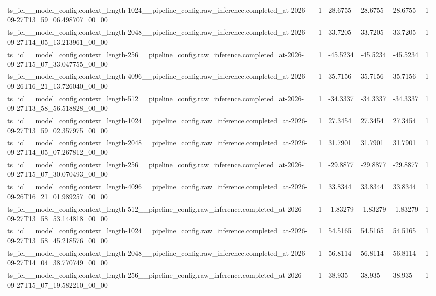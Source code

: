 \begin{tabular}{llllll}
ts\_icl\_\_model\_config.context\_length-1024\_\_pipeline\_config.raw\_inference.completed\_at-2026-09-27T13\_59\_06.498707\_00\_00 & 1 & 28.6755 & 28.6755 & 28.6755 & 1 \\
ts\_icl\_\_model\_config.context\_length-2048\_\_pipeline\_config.raw\_inference.completed\_at-2026-09-27T14\_05\_13.213961\_00\_00 & 1 & 33.7205 & 33.7205 & 33.7205 & 1 \\
ts\_icl\_\_model\_config.context\_length-256\_\_pipeline\_config.raw\_inference.completed\_at-2026-09-27T15\_07\_33.047755\_00\_00 & 1 & -45.5234 & -45.5234 & -45.5234 & 1 \\
ts\_icl\_\_model\_config.context\_length-4096\_\_pipeline\_config.raw\_inference.completed\_at-2026-09-26T16\_21\_13.726040\_00\_00 & 1 & 35.7156 & 35.7156 & 35.7156 & 1 \\
ts\_icl\_\_model\_config.context\_length-512\_\_pipeline\_config.raw\_inference.completed\_at-2026-09-27T13\_58\_56.518828\_00\_00 & 1 & -34.3337 & -34.3337 & -34.3337 & 1 \\
ts\_icl\_\_model\_config.context\_length-1024\_\_pipeline\_config.raw\_inference.completed\_at-2026-09-27T13\_59\_02.357975\_00\_00 & 1 & 27.3454 & 27.3454 & 27.3454 & 1 \\
ts\_icl\_\_model\_config.context\_length-2048\_\_pipeline\_config.raw\_inference.completed\_at-2026-09-27T14\_05\_07.267812\_00\_00 & 1 & 31.7901 & 31.7901 & 31.7901 & 1 \\
ts\_icl\_\_model\_config.context\_length-256\_\_pipeline\_config.raw\_inference.completed\_at-2026-09-27T15\_07\_30.070493\_00\_00 & 1 & -29.8877 & -29.8877 & -29.8877 & 1 \\
ts\_icl\_\_model\_config.context\_length-4096\_\_pipeline\_config.raw\_inference.completed\_at-2026-09-26T16\_21\_01.989257\_00\_00 & 1 & 33.8344 & 33.8344 & 33.8344 & 1 \\
ts\_icl\_\_model\_config.context\_length-512\_\_pipeline\_config.raw\_inference.completed\_at-2026-09-27T13\_58\_53.144818\_00\_00 & 1 & -1.83279 & -1.83279 & -1.83279 & 1 \\
ts\_icl\_\_model\_config.context\_length-1024\_\_pipeline\_config.raw\_inference.completed\_at-2026-09-27T13\_58\_45.218576\_00\_00 & 1 & 54.5165 & 54.5165 & 54.5165 & 1 \\
ts\_icl\_\_model\_config.context\_length-2048\_\_pipeline\_config.raw\_inference.completed\_at-2026-09-27T14\_04\_38.770749\_00\_00 & 1 & 56.8114 & 56.8114 & 56.8114 & 1 \\
ts\_icl\_\_model\_config.context\_length-256\_\_pipeline\_config.raw\_inference.completed\_at-2026-09-27T15\_07\_19.582210\_00\_00 & 1 & 38.935 & 38.935 & 38.935 & 1 \\

\end{tabular}

